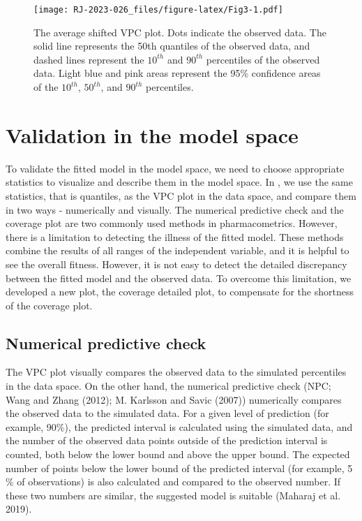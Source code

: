 \begin{figure}
\centering
\texttt{[image: RJ-2023-026\_files/figure-latex/Fig3-1.pdf]}
\caption{\label{fig:Fig3}The average shifted VPC plot. Dots indicate the observed data. The solid line represents the 50th quantiles of the observed data, and dashed lines represent the \(10^{th}\) and \(90^{th}\) percentiles of the observed data. Light blue and pink areas represent the 95\% confidence areas of the \(10^{th}\), \(50^{th}\), and \(90^{th}\) percentiles.}
\end{figure}

\hypertarget{validation-in-the-model-space}{%
\section{Validation in the model space}\label{validation-in-the-model-space}}

To validate the fitted model in the model space, we need to choose appropriate statistics to visualize and describe them in the model space. In , we use the same statistics, that is quantiles, as the VPC plot in the data space, and compare them in two ways - numerically and visually. The numerical predictive check and the coverage plot are two commonly used methods in pharmacometrics. However, there is a limitation to detecting the illness of the fitted model. These methods combine the results of all ranges of the independent variable, and it is helpful to see the overall fitness. However, it is not easy to detect the detailed discrepancy between the fitted model and the observed data. To overcome this limitation, we developed a new plot, the coverage detailed plot, to compensate for the shortness of the coverage plot.

\hypertarget{numerical-predictive-check}{%
\subsection{Numerical predictive check}\label{numerical-predictive-check}}

The VPC plot visually compares the observed data to the simulated percentiles in the data space. On the other hand, the numerical predictive check (NPC; Wang and Zhang (2012); M. Karlsson and Savic (2007))
numerically compares the observed data to the simulated data. For a given level of prediction (for example, 90\(\%\)), the predicted interval is calculated using the simulated data, and the number of the observed data points outside of the prediction interval is counted, both below the lower bound and above the upper bound. The expected number of points below the lower bound of the predicted interval (for example, 5\(\%\) of observations) is also calculated and compared to the observed number. If these two numbers are similar, the suggested model is suitable (Maharaj et al. 2019).


